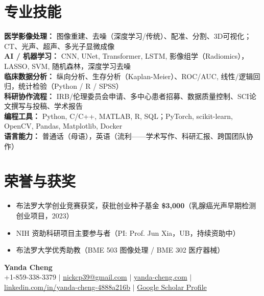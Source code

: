 \documentclass[letterpaper,10pt]{article}
\begin{document}
\vspace{-2pt}

\section{专业技能}
\noindent
\small
\textbf{医学影像处理：} 图像重建、去噪（深度学习/传统）、配准、分割、3D可视化；CT、光声、超声、多光子显微成像 \\
\textbf{AI / 机器学习：} CNN, UNet, Transformer, LSTM, 影像组学（Radiomics），LASSO, SVM, 随机森林，深度学习去噪 \\
\textbf{临床数据分析：} 纵向分析、生存分析（Kaplan-Meier）、ROC/AUC, 线性/逻辑回归，统计检验（Python / R / SPSS）\\
\textbf{科研协作流程：} IRB/伦理委员会申请、多中心患者招募、数据质量控制、SCI论文撰写与投稿、学术报告\\
\textbf{编程工具：} Python, C/C++, MATLAB, R, SQL；PyTorch, scikit-learn, OpenCV, Pandas, Matplotlib, Docker \\
\textbf{语言能力：} 普通话（母语），英语（流利——学术写作、科研汇报、跨国团队协作）

\vspace{-2pt}

\section{荣誉与获奖}
\begin{itemize}[leftmargin=0.2in, itemsep=1pt]
  \item \small 布法罗大学创业竞赛获奖，获批创业种子基金 \textbf{\$3,000}（乳腺癌光声早期检测创业项目，2023）
  \item \small NIH 资助科研项目主要参与者（PI: Prof. Jun Xia，UB，持续资助中）
  \item \small 布法罗大学优秀助教（BME 503 图像处理 / BME 302 医疗器械）
\end{itemize}



\clearpage

\begin{center}
  {\huge \textbf{Yanda Cheng}} \\
  \vspace{4pt}
  \small
  +1-859-338-3379 \quad$|$\quad
  \href{mailto:nickcp39@gmail.com}{nickcp39@gmail.com} \quad$|$\quad
  \href{https://yanda-cheng.com}{yanda-cheng.com} \quad$|$\quad
  \href{https://www.linkedin.com/in/yanda-cheng-4888a216b}{linkedin.com/in/yanda-cheng-4888a216b} \quad$|$\quad
  \href{https://scholar.google.com/citations?view_op=search_authors&mauthors=Yanda+Cheng+University+at+Buffalo}{Google Scholar Profile}
\end{center}
\end{document}

